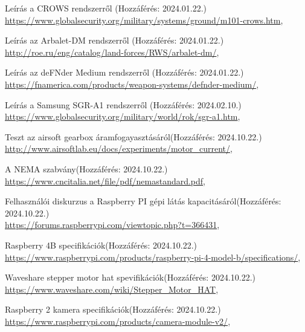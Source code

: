 \documentclass[12pt,a4paper]{article}
\begin{document}
\pagebreak
	\begin{thebibliography}{}
	Leírás a CROWS rendszerről \hfill (Hozzáférés: 2024.01.22.) \\
	{\footnotesize \url{https://www.globalsecurity.org/military/systems/ground/m101-crows.htm}},
	
	Leírás az Arbalet-DM rendszerről \hfill (Hozzáférés: 2024.01.22.) \\
	{\footnotesize \url{http://roe.ru/eng/catalog/land-forces/RWS/arbalet-dm/}},
	
	Leírás az deFNder Medium rendszerről \hfill (Hozzáférés: 2024.01.22.) \\
	{\footnotesize \url{https://fnamerica.com/products/weapon-systems/defnder-medium/}},
	
	Leírás a Samsung SGR-A1 rendszerről \hfill (Hozzáférés: 2024.02.10.) \\
	{\footnotesize \url{https://www.globalsecurity.org/military/world/rok/sgr-a1.htm}},
	
	Teszt az airsoft gearbox áramfogayasztásáról\hfill (Hozzáférés: 2024.10.22.) \\
	{\footnotesize \url{http://www.airsoftlab.eu/docs/experiments/motor_current/}},
	
	A NEMA szabvány\hfill (Hozzáférés: 2024.10.22.) \\
	{\footnotesize \url{https://www.cncitalia.net/file/pdf/nemastandard.pdf}},
	
	Felhasználói diskurzus a Raspberry PI gépi látás kapacitásáról\hfill (Hozzáférés: 2024.10.22.) \\
	{\footnotesize \url{https://forums.raspberrypi.com/viewtopic.php?t=366431}},
	
	Raspberry 4B specifikációk\hfill (Hozzáférés: 2024.10.22.) \\
	{\footnotesize \url{https://www.raspberrypi.com/products/raspberry-pi-4-model-b/specifications/}},
	
	Waveshare stepper motor hat spevifikációk\hfill (Hozzáférés: 2024.10.22.) \\
	{\footnotesize \url{https://www.waveshare.com/wiki/Stepper_Motor_HAT}},

	Raspberry 2 kamera specifikációk\hfill (Hozzáférés: 2024.10.22.) \\
	{\footnotesize \url{https://www.raspberrypi.com/products/camera-module-v2/}},

\end{thebibliography}
\end{document}

